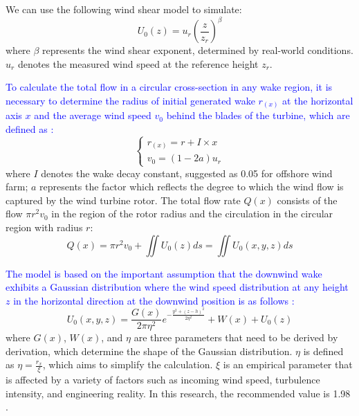 \documentclass[journal,twoside]{IEEEtran}
\begin{document}
    We can use the following wind shear model \cite{kim2012simulation} to simulate:
    \begin{equation}\label{E5}
    	U_0(z)=u_r\left(\frac{z}{z_r}\right)^\beta
    \end{equation}
    where $\beta$ represents the wind shear exponent, determined by real-world conditions. $u_r$ denotes the measured wind speed at the reference height $z_r$.
    
    \textcolor{blue}{To calculate the total flow in a circular cross-section in any wake region, it is necessary to determine the radius of initial generated wake $r_{(x)}$ at the horizontal axis $x$ and the average wind speed $v_0$ behind the blades of the turbine, which are defined as \cite{sun2018study}:}
   	\begin{equation}\label{E6}
   		\left\{
   		\begin{array}{c}
    	r_{(x)} = r + I \times x \\
    	v_0 = (1 - 2a) u_r
    	\end{array}
        \right.
    \end{equation}
    where $I$ denotes the wake decay constant, suggested as 0.05 for offshore wind farm; $a$ represents the factor which reflects the degree to which the wind flow is captured by the wind turbine rotor. The total flow rate $Q(x)$ consists of the flow $\pi r^2 v_0$ in the region of the rotor radius and the circulation in the circular region with radius $r$:
    \begin{equation}\label{E7}
    	Q(x) = \pi r^2 v_0 + \iint U_0(z) ds = \iint U_0(x,y,z) ds
    \end{equation}
    
    \textcolor{blue}{The model is based on the important assumption that the downwind wake exhibits a Gaussian distribution where the wind speed distribution at any height $z$ in the horizontal direction at the downwind position is as follows \cite{sun2023wind}:}
    \begin{equation}\label{E8}
    	U_0(x, y, z) = \frac{G(x)}{2\pi \eta^2} e^{-\frac{y^2 + (z - h)^2}{2 \eta^2}} + W(x) + U_0(z)
    \end{equation}
    where $G(x)$, $W(x)$, and $\eta$ are three parameters that need to be derived by derivation, which determine the shape of the Gaussian distribution. $\eta$ is defined as $\eta = \frac{r_x}{\xi}$, which aims to simplify the calculation. $\xi$ is an empirical parameter that is affected by a variety of factors such as incoming wind speed, turbulence intensity, and engineering reality. In this research, the recommended value is 1.98 \cite{tao2020wind}.
    
\end{document}
